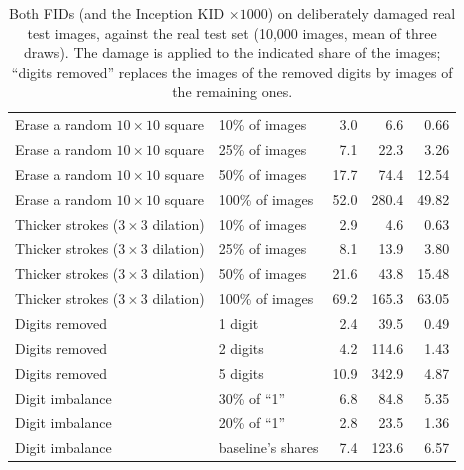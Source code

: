 \begin{table}[H]
\begin{tabular}{llrrr}
\midrule
Erase a random $10\times10$ square & 10\% of images & 3.0 & 6.6 & 0.66 \\
Erase a random $10\times10$ square & 25\% of images & 7.1 & 22.3 & 3.26 \\
Erase a random $10\times10$ square & 50\% of images & 17.7 & 74.4 & 12.54 \\
Erase a random $10\times10$ square & 100\% of images & 52.0 & 280.4 & 49.82 \\
\midrule
Thicker strokes ($3\times3$ dilation) & 10\% of images & 2.9 & 4.6 & 0.63 \\
Thicker strokes ($3\times3$ dilation) & 25\% of images & 8.1 & 13.9 & 3.80 \\
Thicker strokes ($3\times3$ dilation) & 50\% of images & 21.6 & 43.8 & 15.48 \\
Thicker strokes ($3\times3$ dilation) & 100\% of images & 69.2 & 165.3 & 63.05 \\
\midrule
Digits removed & 1 digit & 2.4 & 39.5 & 0.49 \\
Digits removed & 2 digits & 4.2 & 114.6 & 1.43 \\
Digits removed & 5 digits & 10.9 & 342.9 & 4.87 \\
Digit imbalance & 30\% of ``1'' & 6.8 & 84.8 & 5.35 \\
Digit imbalance & 20\% of ``1'' & 2.8 & 23.5 & 1.36 \\
Digit imbalance & baseline's shares & 7.4 & 123.6 & 6.57 \\
\bottomrule
\end{tabular}
\caption{Both FIDs (and the Inception KID $\times 1000$) on deliberately damaged real test images, against the real test set (10,000 images, mean of three draws). The damage is applied to the indicated share of the images; ``digits removed'' replaces the images of the removed digits by images of the remaining ones.}
\label{tab:supp-sensitivity}
\end{table}
